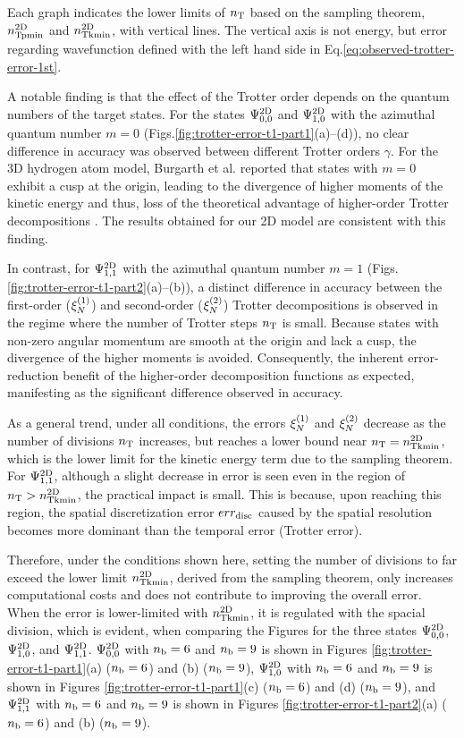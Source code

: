 \documentclass[jctc-draft.tex]{subfiles}
\begin{document}
Each graph indicates the lower limits of $n_{\mathrm{T}}$ based on the sampling theorem,
$n_{\mathrm{Tpmin}}^{\mathrm{2D}}$ and $n_{\mathrm{Tkmin}}^{\mathrm{2D}}$, with vertical lines. The vertical axis is not
energy, but error regarding wavefunction defined with the left hand side in
Eq.\eqref{eq:observed-trotter-error-1st}.

A notable finding is that the effect of the Trotter order depends on the quantum
numbers of the target states. For the states $\Psi^{\mathrm{2D}}_{0,0}$ and
$\Psi^{\mathrm{2D}}_{1,0}$ with the azimuthal quantum number $m=0$
(Figs.\ref{fig:trotter-error-t1-part1}(a)--(d)), no clear difference in accuracy
was observed between different Trotter orders $\gamma$. For the 3D hydrogen atom
model, Burgarth et al. reported that states with $m=0$ exhibit a cusp at the
origin, leading to the divergence of higher moments of the kinetic energy and
thus, loss of the theoretical advantage of higher-order Trotter decompositions
\cite{Burgarth2024.PhysRevResearch.6.043155}. The results obtained for our 2D
model are consistent with this finding.

In contrast, for $\Psi^{\mathrm{2D}}_{1,1}$ with the azimuthal quantum number $m=1$ (Figs.
\ref{fig:trotter-error-t1-part2}(a)--(b)), a distinct difference in accuracy
between the first-order ($\xi_{N}^{(1)}$) and second-order ($\xi_{N}^{(2)}$) Trotter
decompositions is observed in the regime where the number of Trotter steps $n_{\mathrm{T}}$
is small. Because states with non-zero angular momentum are smooth at the origin
and lack a cusp, the divergence of the higher moments is avoided. Consequently,
the inherent error-reduction benefit of the higher-order decomposition functions
as expected, manifesting as the significant difference observed in accuracy.

As a general trend, under all conditions, the errors $\xi_{N}^{(1)}$ and $\xi_{N}^{(2)}$
decrease as the number of divisions $n_{\mathrm{T}}$ increases, but reaches a lower bound
near $n_{\mathrm{T}} = n_{\mathrm{Tkmin}}^{\mathrm{2D}}$, which is the lower limit for the kinetic energy term due to the
sampling theorem. For $\Psi^{\mathrm{2D}}_{1,1}$, although a slight decrease in error is
seen even in the region of $n_{\mathrm{T}} > n_{\mathrm{Tkmin}}^{\mathrm{2D}}$, the practical impact is small.
This is because, upon reaching this region, the spatial discretization error
$err_{\mathrm{disc}}$ caused by the spatial resolution becomes more dominant than the
temporal error (Trotter error).

Therefore, under the conditions shown here, setting the
number of divisions to far exceed the lower limit $n_{\mathrm{Tkmin}}^{\mathrm{2D}}$, derived from
the sampling theorem, only increases computational costs and does not contribute
to improving the overall error. When the error is lower-limited with
$n_{\mathrm{Tkmin}}^{\mathrm{2D}}$, it is regulated with the spacial division, which is evident, when
comparing the Figures for the three states $\Psi^{\mathrm{2D}}_{0,0}$, $\Psi^{\mathrm{2D}}_{1,0}$, and
$\Psi^{\mathrm{2D}}_{1,1}$. $\Psi^{\mathrm{2D}}_{0,0}$ with $n_{\mathrm{b}}=6$ and $n_{\mathrm{b}}=9$ is shown in Figures
\ref{fig:trotter-error-t1-part1}(a) ($n_{\mathrm{b}}=6$) and (b) ($n_{\mathrm{b}}=9$),
$\Psi^{\mathrm{2D}}_{1,0}$ with $n_{\mathrm{b}}=6$ and $n_{\mathrm{b}}=9$ is shown in Figures
\ref{fig:trotter-error-t1-part1}(c) ($n_{\mathrm{b}}=6$) and (d) ($n_{\mathrm{b}}=9$), and
$\Psi^{\mathrm{2D}}_{1,1}$ with $n_{\mathrm{b}}=6$ and $n_{\mathrm{b}}=9$ is shown in Figures
\ref{fig:trotter-error-t1-part2}(a) ($n_{\mathrm{b}}=6$) and (b) ($n_{\mathrm{b}}=9$).
\end{document}
